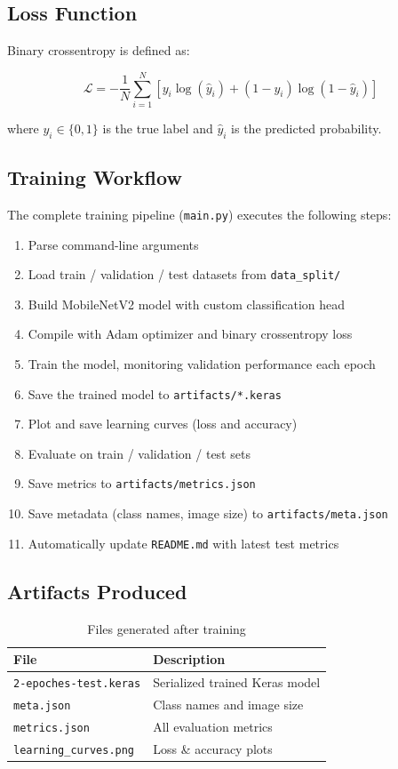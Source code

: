 \documentclass[12pt,a4paper]{article}
\begin{document}
\subsection{Loss Function}

Binary crossentropy is defined as:

$$\mathcal{L} = -\frac{1}{N}\sum_{i=1}^{N}\left[y_i \log(\hat{y}_i) + (1-y_i)\log(1-\hat{y}_i)\right]$$

where $y_i \in \{0, 1\}$ is the true label and $\hat{y}_i$ is the predicted probability.

\subsection{Training Workflow}

The complete training pipeline (\texttt{main.py}) executes the following steps:

\begin{enumerate}
    \item Parse command-line arguments
    \item Load train / validation / test datasets from \texttt{data\_split/}
    \item Build MobileNetV2 model with custom classification head
    \item Compile with Adam optimizer and binary crossentropy loss
    \item Train the model, monitoring validation performance each epoch
    \item Save the trained model to \texttt{artifacts/*.keras}
    \item Plot and save learning curves (loss and accuracy)
    \item Evaluate on train / validation / test sets
    \item Save metrics to \texttt{artifacts/metrics.json}
    \item Save metadata (class names, image size) to \texttt{artifacts/meta.json}
    \item Automatically update \texttt{README.md} with latest test metrics
\end{enumerate}

\subsection{Artifacts Produced}

\begin{table}[H]
    \centering
    \caption{Files generated after training}
    \begin{tabular}{@{}ll@{}}
        \toprule
        \textbf{File} & \textbf{Description} \\
        \midrule
        \texttt{2-epoches-test.keras} & Serialized trained Keras model \\
        \texttt{meta.json}            & Class names and image size \\
        \texttt{metrics.json}         & All evaluation metrics \\
        \texttt{learning\_curves.png} & Loss \& accuracy plots \\
        \bottomrule
    \end{tabular}
\end{table}
\end{document}
